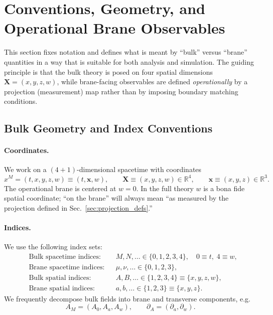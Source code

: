 \documentclass[11pt]{article}
\newcommand{\R}{\mathbb{R}}
\newcommand{\X}{\mathbf{X}}     %
\newcommand{\x}{\mathbf{x}}     %
\begin{document}
\section{Conventions, Geometry, and Operational Brane Observables}
\label{sec:conventions}

This section fixes notation and defines what is meant by ``bulk'' versus ``brane''
quantities in a way that is suitable for both analysis and simulation. The guiding
principle is that the bulk theory is posed on four spatial dimensions
\(\X=(x,y,z,w)\), while brane-facing observables are defined \emph{operationally}
by a projection (measurement) map rather than by imposing boundary matching
conditions.

\subsection{Bulk Geometry and Index Conventions}
\label{sec:bulk_geometry}

\paragraph{Coordinates.}
We work on a \((4+1)\)-dimensional spacetime with coordinates
\begin{equation}
x^M = (t, x, y, z, w) \equiv (t,\x,w),
\qquad
\X \equiv (x,y,z,w)\in\R^4,
\qquad
\x \equiv (x,y,z)\in\R^3.
\label{eq:coords_def}
\end{equation}
The operational brane is centered at \(w=0\). In the full theory \(w\) is a bona
fide spatial coordinate; ``on the brane'' will always mean ``as measured by the
projection defined in Sec.~\ref{sec:projection_defs}.''

\paragraph{Indices.}
We use the following index sets:
\begin{align}
&\text{Bulk spacetime indices:} && M,N,\ldots \in \{0,1,2,3,4\},\quad 0\equiv t,\;4\equiv w,
\nonumber\\
&\text{Brane spacetime indices:} && \mu,\nu,\ldots \in \{0,1,2,3\},
\nonumber\\
&\text{Bulk spatial indices:} && A,B,\ldots \in \{1,2,3,4\}\equiv\{x,y,z,w\},
\nonumber\\
&\text{Brane spatial indices:} && a,b,\ldots \in \{1,2,3\}\equiv\{x,y,z\}.
\label{eq:index_sets}
\end{align}
We frequently decompose bulk fields into brane and transverse components, e.g.
\begin{equation}
A_M=(A_0,A_a,A_w),
\qquad
\partial_A=(\partial_a,\partial_w).
\label{eq:field_decomposition}
\end{equation}
\end{document}
